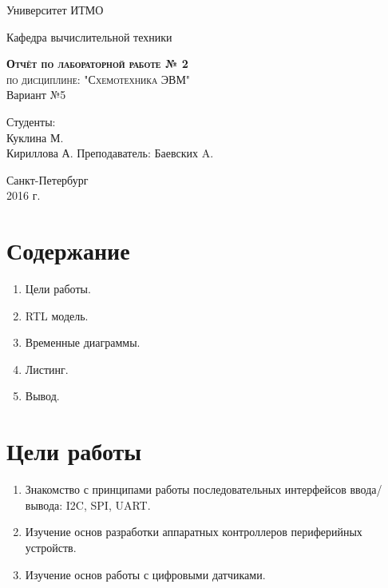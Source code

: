\documentclass[a4paper, 10pt]{article}
\begin{document}
    \begin{titlepage}
        \begin{center}
            \large
            Университет ИТМО
            \vspace{3cm}


            Кафедра вычислительной техники
            \vspace{4cm}

            \textsc{ \textbf{Отчёт по лабораторной работе  № 2} \\ 
            по дисциплине: "Схемотехника ЭВМ"}\\Вариант №5\\[8mm]

            \bigskip
        \end{center}
        \vspace{3cm}

        \hfill\begin{flushright}
             Студенты: \\
             Куклина М.\\
             Кириллова А.
             \vfill
             Преподаватель:
             Баевских A.
        \end{flushright}
        \vfill
        \vfill
        \vfill
        \vfill
        \vfill
        \begin{center}
            Санкт-Петербург \\2016 г.
        \end{center}
    \end{titlepage}
   \newpage
    \section*{Содержание}
        \begin{enumerate}
            \item Цели работы.
            \item RTL модель.
            \item Временные диаграммы.
            \item Листинг.
            \item Вывод.
        \end{enumerate}

    \section*{Цели работы}
        \begin{enumerate}
            \item Знакомство с принципами работы последовательных интерфейсов ввода/вывода: I2C, SPI, UART.
            \item Изучение основ разработки аппаратных контроллеров периферийных устройств.
            \item  Изучение основ работы с цифровыми датчиками.
        \end{enumerate} 
\end{document}
